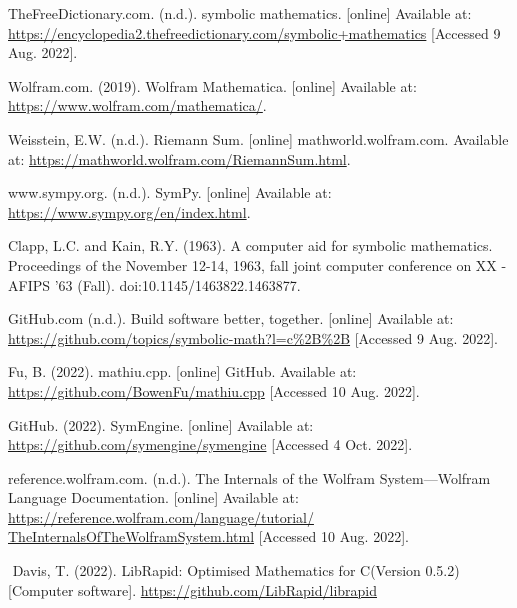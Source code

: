 \documentclass[12pt]{article}
\def\CC{{C\nolinebreak[4]\hspace{-.05em}\raisebox{.4ex}{\tiny\bf ++ }}}
\begin{document}
\pagebreak

\begin{thebibliography}{X}
 TheFreeDictionary.com. (n.d.). symbolic mathematics. [online] Available at: \href{https://encyclopedia2.thefreedictionary.com/symbolic+mathematics}{https://encyclopedia2.thefreedictionary.com/symbolic+mathematics} [Accessed 9 Aug. 2022].

 Wolfram.com. (2019). Wolfram Mathematica. [online] Available at: \href{https://www.wolfram.com/mathematica/}{https://www.wolfram.com/mathematica/}.

 Weisstein, E.W. (n.d.). Riemann Sum. [online] mathworld.wolfram.com. Available at: \href{https://mathworld.wolfram.com/RiemannSum.html}{https://mathworld.wolfram.com/RiemannSum.html}.

 www.sympy.org. (n.d.). SymPy. [online] Available at: \href{https://www.sympy.org/en/index.html}{https://www.sympy.org/en/index.html}.

 Clapp, L.C. and Kain, R.Y. (1963). A computer aid for symbolic mathematics. Proceedings of the November 12-14, 1963, fall joint computer conference on XX - AFIPS ’63 (Fall). doi:10.1145/1463822.1463877.

 GitHub.com (n.d.). Build software better, together. [online] Available at: \href{https://github.com/topics/symbolic-math?l=c\%2B\%2B}{https://github.com/topics/symbolic-math?l=c\%2B\%2B} [Accessed 9 Aug. 2022].

 Fu, B. (2022). mathiu.cpp. [online] GitHub. Available at: \href{https://github.com/BowenFu/mathiu.cpp}{https://github.com/BowenFu/mathiu.cpp} [Accessed 10 Aug. 2022].

 GitHub. (2022). SymEngine. [online] Available at: \href{https://github.com/symengine/symengine}{https://github.com/symengine/symengine} [Accessed 4 Oct. 2022].

 reference.wolfram.com. (n.d.). The Internals of the Wolfram System—Wolfram Language Documentation. [online] Available at: \href{https://reference.wolfram.com/language/tutorial/TheInternalsOfTheWolframSystem.html}{https://reference.wolfram.com/language/tutorial/ TheInternalsOfTheWolframSystem.html} [Accessed 10 Aug. 2022].

‌ Davis, T. (2022). LibRapid: Optimised Mathematics for \CC (Version 0.5.2) [Computer software]. \href{https://github.com/LibRapid/librapid}{https://github.com/LibRapid/librapid}


\end{thebibliography}
\end{document}
